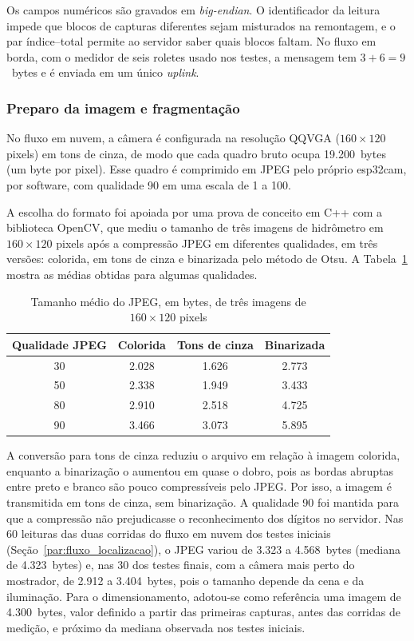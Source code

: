 Os campos numéricos são gravados em \textit{big-endian}. O identificador da leitura
impede que blocos de capturas diferentes sejam misturados na remontagem, e o par
índice--total permite ao servidor saber quais blocos faltam. No fluxo em borda, com o
medidor de seis roletes usado nos testes, a mensagem tem $3 + 6 = 9$~bytes e é enviada
em um único \textit{uplink}.

\subsubsection{Preparo da imagem e fragmentação}
\label{subsubsec:preparo_imagem}

No fluxo em nuvem, a câmera é configurada na resolução QQVGA ($160 \times 120$ pixels) em
tons de cinza, de modo que cada quadro bruto ocupa 19.200~bytes (um byte por pixel). Esse
quadro é comprimido em JPEG pelo próprio \gls{esp32cam}, por software, com qualidade 90
em uma escala de 1 a 100.

A escolha do formato foi apoiada por uma prova de conceito em C++ com a biblioteca
OpenCV, que mediu o tamanho de três imagens de hidrômetro em $160 \times 120$ pixels
após a compressão JPEG em diferentes qualidades, em três versões: colorida, em tons de
cinza e binarizada pelo método de Otsu. A Tabela~\ref{tab:poc_compressao} mostra as
médias obtidas para algumas qualidades.

\begin{table}[H]
    \centering
    \caption{Tamanho médio do JPEG, em bytes, de três imagens de $160 \times 120$ pixels}
    \label{tab:poc_compressao}
    \begin{tabular}{@{}cccc@{}}
        \toprule
        \textbf{Qualidade JPEG} & \textbf{Colorida} & \textbf{Tons de cinza}
        & \textbf{Binarizada} \\
        \midrule
        30 & 2.028 & 1.626 & 2.773 \\
        50 & 2.338 & 1.949 & 3.433 \\
        80 & 2.910 & 2.518 & 4.725 \\
        90 & 3.466 & 3.073 & 5.895 \\
        \bottomrule
    \end{tabular}
\end{table}

A conversão para tons de cinza reduziu o arquivo em relação à imagem colorida, enquanto a
binarização o aumentou em quase o dobro, pois as bordas abruptas entre preto e branco são
pouco compressíveis pelo JPEG. Por isso, a imagem é transmitida em tons de cinza, sem
binarização. A qualidade 90 foi mantida para que a compressão não prejudicasse o
reconhecimento dos dígitos no servidor. Nas 60 leituras das duas corridas do fluxo em
nuvem dos testes iniciais (Seção~\ref{par:fluxo_localizacao}), o JPEG variou de 3.323 a 4.568~bytes (mediana de 4.323~bytes) e, nas 30
dos testes finais, com a câmera mais perto do mostrador, de 2.912 a 3.404~bytes, pois o
tamanho depende da cena e da iluminação. Para o dimensionamento, adotou-se como referência
uma imagem de 4.300~bytes, valor definido a partir das primeiras capturas, antes das
corridas de medição, e próximo da mediana observada nos testes iniciais.

